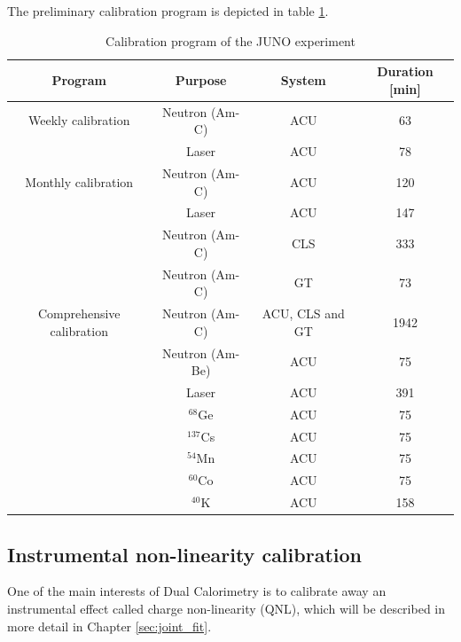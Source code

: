 \documentclass[../main.tex]{subfiles}
\begin{document}
The preliminary calibration program is depicted in table \ref{tab:juno:calib_prog}.

\begin{table}[ht]
  \centering
  \begin{tabular}{c c c c}
    \hline
    Program & Purpose & System & Duration [min] \\
    \hline
    Weekly calibration & Neutron (Am-C) & ACU & 63 \\
                       & Laser & ACU & 78  \\
                       \hline
    Monthly calibration & Neutron (Am-C) & ACU & 120 \\
                        & Laser  & ACU  & 147 \\
                        & Neutron (Am-C) & CLS & 333 \\
                        & Neutron (Am-C) & GT  & 73  \\
                        \hline
    Comprehensive calibration & Neutron (Am-C) & ACU, CLS and GT & 1942 \\
                              & Neutron (Am-Be) & ACU & 75 \\
                              & Laser & ACU & 391 \\
                              & $^{68}$Ge & ACU & 75 \\
                              & $^{137}$Cs & ACU & 75 \\
                              & $^{54}$Mn & ACU & 75 \\
                              & $^{60}$Co & ACU & 75 \\
                              & $^{40}$K & ACU & 158 \\
    \hline
  \end{tabular}
  \caption{Calibration program of the JUNO experiment}
  \label{tab:juno:calib_prog}
\end{table}

\subsection{Instrumental non-linearity calibration}
\label{sec:juno:instr_nl}

One of the main interests of Dual Calorimetry is to calibrate away an instrumental effect called charge non-linearity (QNL), which will be described in more detail in Chapter \ref{sec:joint_fit}.
\end{document}
